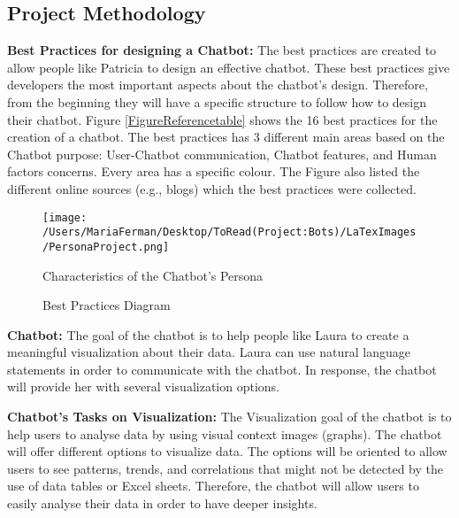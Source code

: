 \documentclass[a4paper,10pt]{article}
\begin{document}
\subsection*{Project Methodology}

\textbf{Best Practices for designing a Chatbot:} The best practices are created to allow people like Patricia to design an effective chatbot. These best practices give developers the most important aspects about the chatbot's design. Therefore, from the beginning they will have a specific structure to follow how to design their chatbot. Figure \ref{FigureReferencetable} shows the 16 best practices for the creation of a chatbot. The best practices has 3 different main areas based on the Chatbot purpose: User-Chatbot communication, Chatbot features, and Human factors concerns. Every area has a specific colour. The Figure also listed the different online sources (e.g., blogs) which the best practices were collected. 

\begin{figure}
\centering
\texttt{[image: /Users/MariaFerman/Desktop/ToRead(Project:Bots)/LaTexImages/PersonaProject.png]}
\caption{Characteristics of the Chatbot's Persona}
\label{FigureLaura}
\end{figure}

\begin{figure}[p]
    \caption{Best Practices Diagram}
    \label{FigureBestPracticeDiagram}
\end{figure}

\textbf{Chatbot:} The goal of the chatbot is to help people like Laura to create a meaningful visualization about their data. Laura can use natural language statements in order to communicate with the chatbot. In response, the chatbot will provide her with several visualization options.

\textbf{Chatbot's Tasks on Visualization:} The Visualization goal of the chatbot is to help users to analyse data by using visual context images (graphs). The chatbot will offer different options to visualize data. The options will be oriented to allow users to see patterns, trends, and correlations that might not be detected by the use of data tables or Excel sheets. Therefore, the chatbot will allow users to easily analyse their data in order to have deeper insights.  
\end{document}
